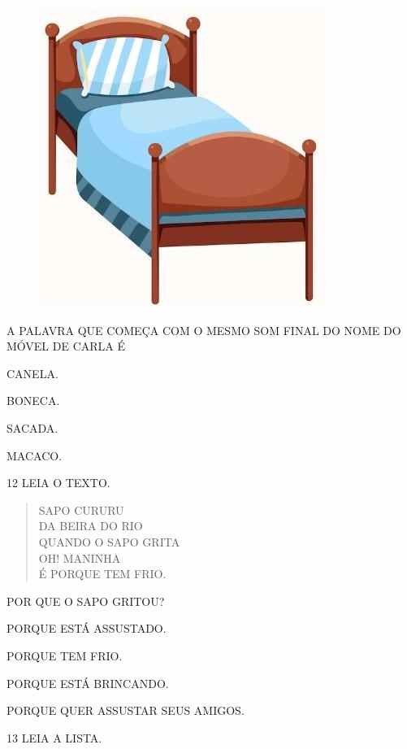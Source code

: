 \begin{figure}[H]
\centering
\includegraphics[width=.2\textwidth]{media/image235.jpg}
\end{figure}

A PALAVRA QUE COMEÇA COM O MESMO SOM FINAL DO NOME DO MÓVEL DE CARLA É 

\begin{escolha}[itemsep=0pt]
\item CANELA.

\item BONECA.

\item SACADA.

\item MACACO.
\end{escolha}

\num{12} LEIA O TEXTO.

\begin{myquote}
\begin{verse}
SAPO CURURU\\
DA BEIRA DO RIO\\
QUANDO O SAPO GRITA\\
OH! MANINHA\\
É PORQUE TEM FRIO.
\end{verse}

\end{myquote}

POR QUE O SAPO GRITOU?

\begin{escolha}
\item PORQUE ESTÁ ASSUSTADO. 

\item PORQUE TEM FRIO.

\item PORQUE ESTÁ BRINCANDO.

\item PORQUE QUER ASSUSTAR SEUS AMIGOS.
\end{escolha}

\pagebreak

\num{13} LEIA A LISTA.

